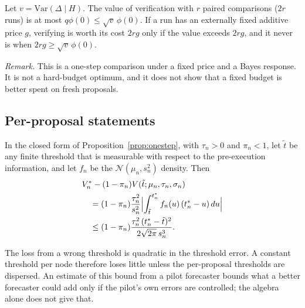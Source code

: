 \begin{proposition}\label{prop:app-verify}
Let $v=\mathrm{Var}(\Delta\mid H)$. The value of verification with $r$ paired comparisons ($2r$ runs) is at most $q\phi(0)\le\sqrt{v}\,\phi(0)$. If a run has an externally fixed additive price $g$, verifying is worth its cost $2rg$ only if the value exceeds $2rg$, and it never is when $2rg\ge\sqrt{v}\,\phi(0)$.
\end{proposition}

\emph{Remark.} This is a one-step comparison under a fixed price and a Bayes response. It is not a hard-budget optimum, and it does not show that a fixed budget is better spent on fresh proposals.

\subsection{Per-proposal statements}

\begin{proposition}\label{prop:app-gap}
In the closed form of Proposition~\ref{prop:onestep}, with $\tau_n>0$ and $\pi_n<1$, let $\tilde t$ be any finite threshold that is measurable with respect to the pre-execution information, and let $f_n$ be the $\mathcal{N}(\mu_n,s_n^2)$ density. Then
\begin{align*}
&V^*_n-(1-\pi_n)V(\tilde t;\mu_n,\tau_n,\sigma_n)\\
&\quad=(1-\pi_n)\frac{\tau_n^2}{s_n^2}\Bigl|\int_{\tilde t}^{t^*_n}f_n(u)\,(t^*_n-u)\,du\Bigr|\\
&\quad\le(1-\pi_n)\frac{\tau_n^2\,(t^*_n-\tilde t)^2}{2\sqrt{2\pi}\,s_n^3}.
\end{align*}
\end{proposition}

The loss from a wrong threshold is quadratic in the threshold error. A constant threshold per node therefore loses little unless the per-proposal thresholds are dispersed. An estimate of this bound from a pilot forecaster bounds what a better forecaster could add only if the pilot's own errors are controlled; the algebra alone does not give that.

